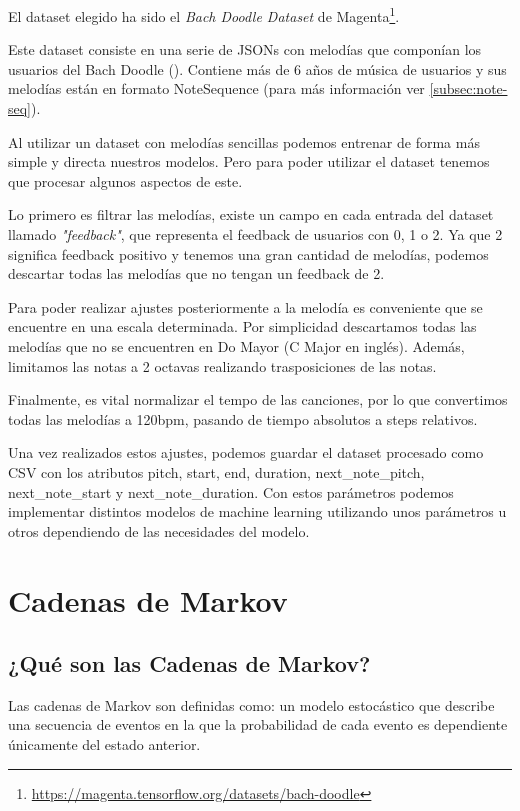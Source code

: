 El dataset elegido ha sido el \textit{Bach Doodle Dataset} de Magenta\footnote{\url{https://magenta.tensorflow.org/datasets/bach-doodle}}.

Este dataset consiste en una serie de JSONs con melodías que componían los usuarios del Bach Doodle (\cite{BachDoodlePaper}). Contiene más de 6 años de música de usuarios y sus melodías están en formato NoteSequence (para más información ver \ref{subsec:note-seq}).

Al utilizar un dataset con melodías sencillas podemos entrenar de forma más simple y directa nuestros modelos. Pero para poder utilizar el dataset tenemos que procesar algunos aspectos de este.

Lo primero es filtrar las melodías, existe un campo en cada entrada del dataset llamado \textit{"feedback"}, que representa el feedback de usuarios con 0, 1 o 2. Ya que 2 significa feedback positivo y tenemos una gran cantidad de melodías, podemos descartar todas las melodías que no tengan un feedback de 2.

Para poder realizar ajustes posteriormente a la melodía es conveniente que se encuentre en una escala determinada. Por simplicidad descartamos todas las melodías que no se encuentren en Do Mayor (C Major en inglés). Además, limitamos las notas a 2 octavas realizando trasposiciones de las notas.

Finalmente, es vital normalizar el tempo de las canciones, por lo que convertimos todas las melodías a 120bpm, pasando de tiempo absolutos a steps relativos.

Una vez realizados estos ajustes, podemos guardar el dataset procesado como CSV con los atributos pitch, start, end, duration, next\_note\_pitch, next\_note\_start y next\_note\_duration. Con estos parámetros podemos implementar distintos modelos de machine learning utilizando unos parámetros u otros dependiendo de las necesidades del modelo.

\section{Cadenas de Markov}
\label{sec:markov-chain}

    \subsection{¿Qué son las Cadenas de Markov?}
    \label{subsec:definicionCadenasMarkov}
    Las cadenas de Markov son definidas como: un modelo estocástico que describe una secuencia de eventos en la que la probabilidad de cada evento es dependiente únicamente del estado anterior.

